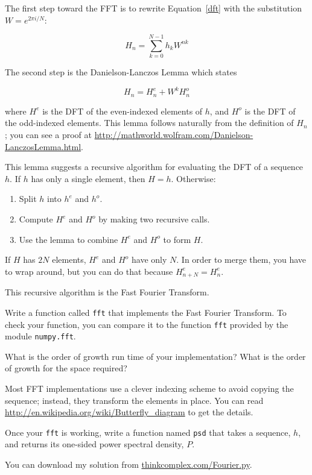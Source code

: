\documentclass[10pt]{book}
\begin{document}
The first step toward the FFT is to rewrite Equation~\ref{dft}
with the substitution $W = e^{2 \pi i/N}$:

\begin{equation}
H_n = \sum_{k=0}^{N-1} h_k W^{n k}
\end{equation}

The second step is the Danielson-Lanczos Lemma which states

\[ H_n = H^e_n + W^k H^o_n \]

where $H^e$ is the DFT of the even-indexed elements
of $h$, and $H^o$ is the DFT of the odd-indexed elements.
This lemma follows naturally from the definition of $H_n$; you can see
a proof at \url{http://mathworld.wolfram.com/Danielson-LanczosLemma.html}.

This lemma suggests a recursive algorithm for evaluating the DFT
of a sequence $h$.  If  $h$ has only a single element, then $H=h$.
Otherwise:

\begin{enumerate}

\item Split $h$ into $h^e$ and $h^o$.

\item Compute $H^e$ and $H^o$ by making two recursive calls.

\item Use the lemma to combine $H^e$ and $H^o$ to form $H$.

\end{enumerate}

If $H$ has $2N$ elements, $H^e$ and $H^o$ have only $N$.
In order to merge them, you have to wrap around, but you
can do that because $H^e_{n+N} = H^e_{n}$.

This recursive algorithm is the Fast Fourier Transform.

\begin{exercise}

Write a function called {\tt fft} that implements
the Fast Fourier Transform.  To check your function, you
can compare it to the function {\tt fft} provided by
the module {\tt numpy.fft}.

What is the order of growth run time of your implementation?
What is the order of growth for the space required?

Most FFT implementations use a clever indexing scheme to avoid copying
the sequence; instead, they transform the elements in place.  You can
read \url{http://en.wikipedia.org/wiki/Butterfly_diagram} to get the details.

Once your {\tt fft} is working, write a function named
{\tt psd} that takes a sequence, $h$, and returns its
one-sided power spectral density, $P$.

You can download my solution from \url{thinkcomplex.com/Fourier.py}.

\end{exercise}
\end{document}

